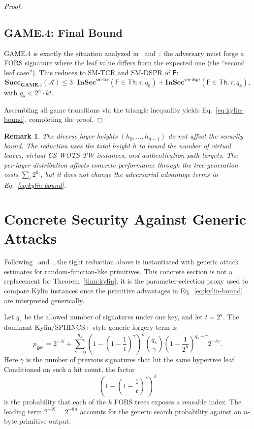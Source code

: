 \documentclass[11pt,a4paper]{article}
\newtheorem{remark}[theorem]{Remark}
\newcommand{\F}{\mathsf{F}}
\newcommand{\Th}{\mathsf{Th}}
\newcommand{\InSec}[1]{\mathbf{InSec}^{\mathsf{#1}}}
\newcommand{\Succ}{\mathbf{Succ}}
\newcommand{\GAME}{\mathbf{GAME}}
\newcommand{\Nbits}{N}
\begin{document}
\begin{proof}
\subsection*{GAME.4: Final Bound}
GAME.4 is exactly the situation analyzed in~\cite[Claim~23]{BHK+19} and~\cite[Eq.~(12)]{HK22}: the adversary must forge a FORS signature where the leaf value differs from the expected one (the ``second leaf case''). This reduces to SM-TCR and SM-DSPR of $\F$:
\[
\Succ_{\GAME.4}(\mathcal{A}) \le 3 \cdot \InSec{sm\text{-}tcr}(\F \in \boldsymbol{\Th}; \tau, q_8) + \InSec{sm\text{-}dspr}(\F \in \boldsymbol{\Th}; \tau, q_8),
\]
with $q_8 < 2^h \cdot kt$.

\medskip
Assembling all game transitions via the triangle inequality yields Eq.~\eqref{eq:kylin-bound}, completing the proof.
\end{proof}

\begin{remark}
The diverse layer heights $(h_0,\ldots,h_{d-1})$ do not affect the security bound. The reduction uses the total height $h$ to bound the number of virtual leaves, virtual CS-WOTS-TW instances, and authentication-path targets. The per-layer distribution affects concrete performance through the tree-generation costs $\sum_i 2^{h_i}$, but it does not change the adversarial advantage terms in Eq.~\eqref{eq:kylin-bound}.
\end{remark}




\section{Concrete Security Against Generic Attacks}
\label{sec:concrete}

Following~\cite[Section~8]{HK22} and~\cite[Section~5]{BHK+19}, the tight reduction above is instantiated with generic attack estimates for random-function-like primitives. This concrete section is not a replacement for Theorem~\ref{thm:kylin}; it is the parameter-selection proxy used to compare Kylin instances once the primitive advantages in Eq.~\eqref{eq:kylin-bound} are interpreted generically.

Let $q_s$ be the allowed number of signatures under one key, and let $t=2^a$. The dominant Kylin/SPHINCS+-style generic forgery term is
\[
p_{\mathsf{gen}}
=2^{-\Nbits}
+\sum_{\gamma=0}^{q_s}
\left(1-\left(1-\frac{1}{t}\right)^\gamma\right)^k
\binom{q_s}{\gamma}
\left(1-\frac{1}{2^h}\right)^{q_s-\gamma}
2^{-h\gamma}.
\]
Here $\gamma$ is the number of previous signatures that hit the same hypertree leaf. Conditioned on such a hit count, the factor
\[
\left(1-\left(1-\frac{1}{t}\right)^\gamma\right)^k
\]
is the probability that each of the $k$ FORS trees exposes a reusable index. The leading term $2^{-\Nbits}=2^{-8n}$ accounts for the generic search probability against an $n$-byte primitive output.
\end{document}
